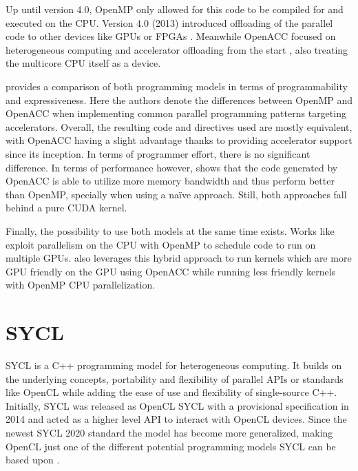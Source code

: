 Up until version 4.0, OpenMP only allowed for this code to be compiled for and executed on the CPU. Version 4.0 (2013) introduced offloading of the parallel code to other devices like GPUs or FPGAs \cite{openmp_gpu_support}. Meanwhile OpenACC focused on heterogeneous computing and accelerator offloading from the start \cite{openacc_initial_spec}, also treating the multicore CPU itself as a device.

\cite{openmp_vs_openacc} provides a comparison of both programming models in terms of programmability and expressiveness. Here the authors denote the differences between OpenMP and OpenACC when implementing common parallel programming patterns targeting accelerators. Overall, the resulting code and directives used are mostly equivalent, with OpenACC having a slight advantage thanks to providing accelerator support since its inception. In terms of programmer effort, there is no significant difference. In terms of performance however, \cite{cuda_openacc_openmp_performance} shows that the code generated by OpenACC is able to utilize more memory bandwidth and thus perform better than OpenMP, specially when using a naïve approach. Still, both approaches fall behind a pure CUDA kernel.

Finally, the possibility to use both models at the same time exists. Works like \cite{openmp_openacc_multigpus} exploit parallelism on the CPU with OpenMP to schedule code to run on multiple GPUs. \cite{openmp_openacc_molecular_docking} also leverages this hybrid approach to run kernels which are more GPU friendly on the GPU using OpenACC while running less friendly kernels with OpenMP CPU parallelization. 

\section{SYCL}
SYCL \cite{sycl_2020_standard} is a C++ programming model for heterogeneous computing. It builds on the underlying concepts, portability and flexibility of parallel APIs or standards like OpenCL while adding the ease of use and flexibility of single-source C++. Initially, SYCL was released as OpenCL SYCL with a provisional specification in 2014 and acted as a higher level API to interact with OpenCL devices. Since the newest SYCL 2020 standard the model has become more generalized, making OpenCL just one of the different potential programming models SYCL can be based upon \cite{sycl_faq}.

